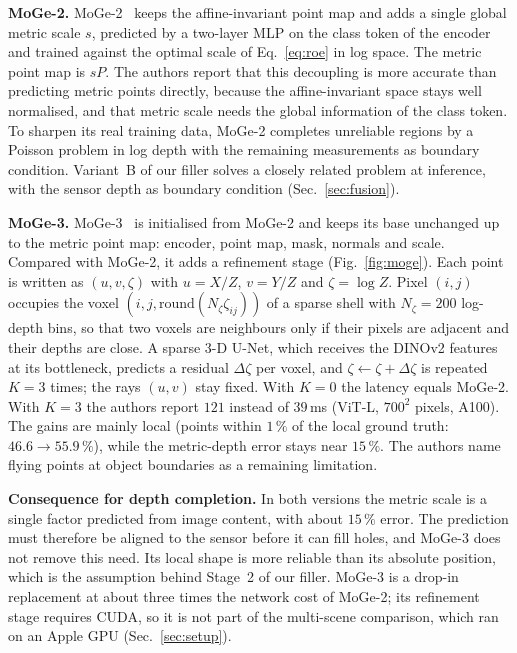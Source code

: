 \documentclass[conference]{IEEEtran}
\begin{document}
\textbf{MoGe-2.} MoGe-2~\cite{wang2025moge2} keeps the affine-invariant point map
and adds a single global metric scale \(s\), predicted by a two-layer MLP on the
class token of the encoder and trained against the optimal scale of
Eq.~\eqref{eq:roe} in log space. The metric point map is \(sP\). The authors
report that this decoupling is more accurate than predicting metric points
directly, because the affine-invariant space stays well normalised, and that
metric scale needs the global information of the class token. To sharpen its
real training data, MoGe-2 completes unreliable regions by a Poisson problem in
log depth with the remaining measurements as boundary condition. Variant~B of
our filler solves a closely related problem at inference, with the sensor depth
as boundary condition (Sec.~\ref{sec:fusion}).

\textbf{MoGe-3.} MoGe-3~\cite{kong2026moge3} is initialised from MoGe-2 and
keeps its base unchanged up to the metric point map: encoder, point map, mask,
normals and scale. Compared with MoGe-2, it adds a refinement stage
(Fig.~\ref{fig:moge}). Each point is written as \((u,v,\zeta)\) with
\(u=X/Z\), \(v=Y/Z\) and \(\zeta=\log Z\). Pixel \((i,j)\) occupies the voxel
\((i,j,\mathrm{round}(N_\zeta\zeta_{ij}))\) of a sparse shell with \(N_\zeta=200\)
log-depth bins, so that two voxels are neighbours only if their pixels are
adjacent and their depths are close. A sparse 3-D U-Net, which receives the
DINOv2 features at its bottleneck, predicts a residual \(\Delta\zeta\) per voxel,
and \(\zeta\leftarrow\zeta+\Delta\zeta\) is repeated \(K=3\) times; the rays
\((u,v)\) stay fixed. With \(K=0\) the latency equals MoGe-2. With \(K=3\) the
authors report \(121\) instead of \(39\,\)ms (ViT-L, \(700^2\) pixels, A100). The
gains are mainly local (points within \(1\,\%\) of the local ground truth:
\(46.6\to55.9\,\%\)), while the metric-depth error stays near \(15\,\%\). The
authors name flying points at object boundaries as a remaining limitation.

\textbf{Consequence for depth completion.} In both versions the metric scale is a
single factor predicted from image content, with about \(15\,\%\) error. The
prediction must therefore be aligned to the sensor before it can fill holes,
and MoGe-3 does not remove this need. Its local shape is more reliable than its
absolute position, which is the assumption behind Stage~2 of our filler.
MoGe-3 is a drop-in replacement at about three times the network cost of
MoGe-2; its refinement stage requires CUDA, so it is not part of the
multi-scene comparison, which ran on an Apple GPU (Sec.~\ref{sec:setup}).
\end{document}
